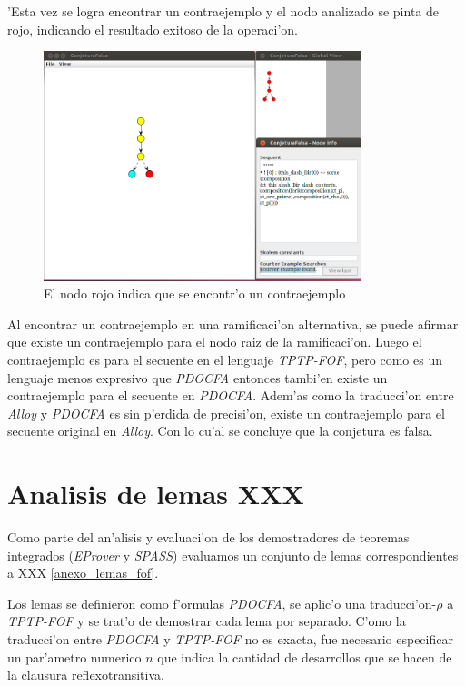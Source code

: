 'Esta vez se logra encontrar un contraejemplo y el nodo analizado se pinta de rojo, indicando el resultado exitoso de la operaci'on.

\begin{figure}[H]
	\includegraphics[width=350px]{img/conjetura_falsa_4.png}
	\centering
	\caption{El nodo rojo indica que se encontr'o un contraejemplo}
\end{figure}

Al encontrar un contraejemplo en una ramificaci'on alternativa, se puede afirmar que existe un contraejemplo para el nodo raiz de la ramificaci'on. Luego el contraejemplo es para el secuente en el lenguaje \textit{TPTP-FOF}, pero como es un lenguaje menos expresivo que \textit{PDOCFA} entonces tambi'en existe un contraejemplo para el secuente en \textit{PDOCFA}. Adem'as como la traducci'on entre \textit{Alloy} y \textit{PDOCFA} es sin p'erdida de precisi'on, existe un contraejemplo para el secuente original en \textit{Alloy}. Con lo cu'al se concluye que la conjetura es falsa.


\section{Analisis de lemas XXX}
\label{analisis_lemas}
Como parte del an'alisis y evaluaci'on de los demostradores de teoremas integrados (\textit{EProver} y \textit{SPASS}) evaluamos un conjunto de lemas correspondientes a XXX \ref{anexo_lemas_fof}.

Los lemas se definieron como f'ormulas \textit{PDOCFA}, se aplic'o una traducci'on-$\rho$ a \textit{TPTP-FOF} y se trat'o de demostrar cada lema por separado. C'omo la traducci'on entre \textit{PDOCFA} y \textit{TPTP-FOF} no es exacta, fue necesario especificar un par'ametro numerico $n$ que indica la cantidad de desarrollos que se hacen de la clausura reflexotransitiva.

